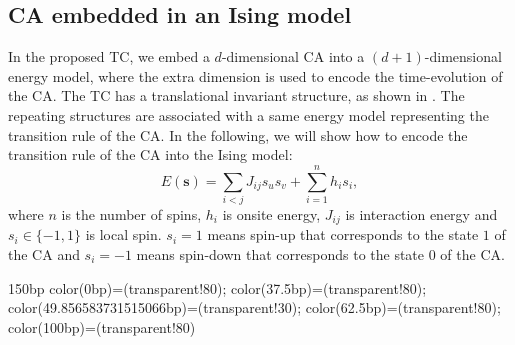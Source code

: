 \documentclass[twocolumn,superscriptaddress,english,showpacs,longbibliography]{revtex4-2}
\newcommand{\vs}{{\mathbf{s}}}
\begin{document}
\subsection{CA embedded in an Ising model}

In the proposed TC, we embed a $d$-dimensional CA into a $(d+1)$-dimensional energy model, where the extra dimension is used to encode the time-evolution of the CA.
The TC has a translational invariant structure, as shown in .
The repeating structures are associated with a same energy model representing the transition rule of the CA.
In the following, we will show how to encode the transition rule of the CA into the Ising model:
\begin{equation}\label{eq:ising}
E(\vs) = \sum_{i < j} J_{ij}s_us_v + \sum_{i=1}^{n}h_i s_i,
\end{equation}
where $n$ is the number of spins, $h_i$ is onsite energy, $J_{ij}$ is interaction energy and
$s_i \in \{-1, 1\}$ is local spin. $s_i=1$ means spin-up that corresponds to the state $1$ of the CA and $s_i=-1$ means spin-down that corresponds to the state $0$ of the CA.

 {150bp} {color(0bp)=(transparent!80);
color(37.5bp)=(transparent!80);
color(49.856583731515066bp)=(transparent!30);
color(62.5bp)=(transparent!80);
color(100bp)=(transparent!80) } 
\end{document}
